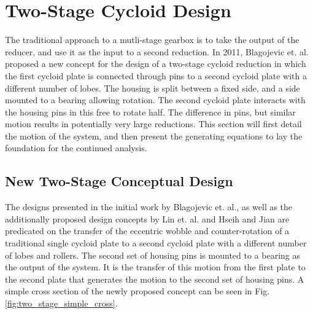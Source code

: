 \section{Two-Stage Cycloid Design} \label{ch:dual:initial_equations}

The traditional approach to a mutli-stage gearbox is to take the output of the reducer, and use it as the input to a second reduction. In 2011, Blagojevic et. al. \cite{ref:new_two_stage} proposed a new concept for the design of a two-stage cycloid reduction in which  the first cycloid plate is connected through pins to a second cycloid plate with a different number of lobes. The housing is split between a fixed side, and a side mounted to a bearing allowing rotation. The second cycloid plate interacts with the housing pins in this free to rotate half. The difference in pins, but similar motion results in potentially very large reductions. This section will first detail the motion of the system, and then present the generating equations to lay the foundation for the continued analysis. 

\subsection{New Two-Stage Conceptual Design} \label{ch:dual:initial_equation:motion}

The designs presented in the initial work by Blagojevic et. al., as well as the additionally proposed design concepts by Lin et. al. \cite{ref:two_stage_tooth_mod} and Hseih and Jian \cite{ref:hsieh_effect_2016} are predicated on the transfer of the eccentric wobble and counter-rotation of a traditional single cycloid plate to a second cycloid plate with a different number of lobes and rollers. The second set of housing pins is mounted to a bearing as the output of the system. It is the transfer of this motion from the first plate to the second plate that generates the motion to the second set of housing pins. A simple cross section of the newly proposed concept can be seen in Fig. \ref{fig:two_stage_simple_cross}. 

